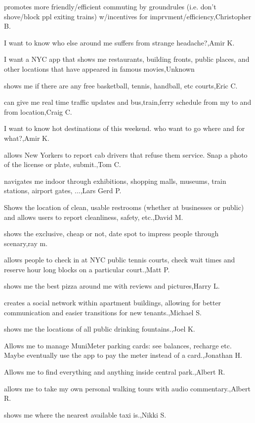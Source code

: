 \documentclass{article}
\begin{document}
promotes more friendly/efficient commuting by groundrules (i.e. don't shove/block ppl exiting trains) w/incentives for imprvment/efficiency,Christopher B.

I want to know who else around me suffers from strange headache?,Amir K.

I want a NYC app that shows me restaurants, building fronts, public places, and other locations that have appeared in famous movies,Unknown

shows me if there are any free basketball, tennis, handball, etc courts,Eric C.

can give me real time traffic updates and bus,train,ferry schedule from my to and from location,Craig C.

I want to know hot destinations of this weekend. who want to go where and for what?,Amir K.

allows New Yorkers to report cab drivers that refuse them service. Snap a photo of the license or plate, submit.,Tom C.

navigates me indoor through exhibitions, shopping malls, museums, train stations, airport gates, ...,Lars Gerd P.

Shows the location of clean, usable restrooms (whether at businesses or public) and allows users to report cleanliness, safety, etc.,David M.

shows the exclusive, cheap or not, date spot to impress people through scenary,ray m.

allows people to check in at NYC public tennis courts, check wait times and reserve hour long blocks on a particular court.,Matt P.

shows me the best pizza around me with reviews and pictures,Harry L.

creates a social network within apartment buildings, allowing for better communication and easier transitions for new tenants.,Michael S.

shows me the locations of all public drinking fountains.,Joel K.

Allows me to manage MuniMeter parking cards: see balances, recharge etc. Maybe eventually use the app to pay the meter instead of a card.,Jonathan H.

Allows me to find everything and anything inside central park.,Albert R.

allows me to take my own personal walking tours with audio commentary.,Albert R.

shows me where the nearest available taxi is.,Nikki S.
\end{document}
